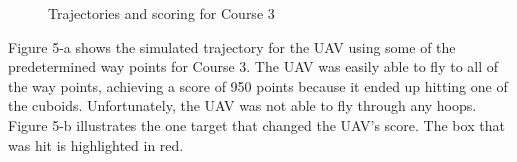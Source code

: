 \documentclass[12pt]{article}
\begin{document}
\begin{figure}[H]
	\caption{Trajectories and scoring for Course 3}
\end{figure}
Figure 5-a shows the simulated trajectory for the UAV using some of the predetermined way points for Course 3. The UAV was easily able to fly to all of the way points, achieving a score of 950 points because it ended up hitting one of the cuboids. Unfortunately, the UAV was not able to fly through any hoops. Figure 5-b illustrates the one target that changed the UAV's score. The box that was hit is highlighted in red. 
\\
\end{document}
